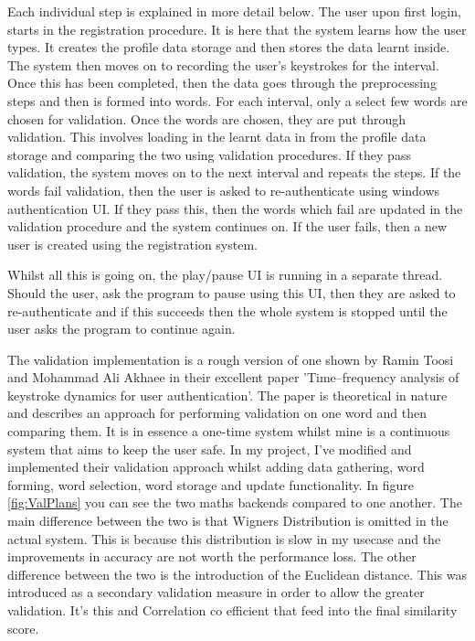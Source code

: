 \documentclass[10pt,a4paper]{report}
\begin{document}
Each individual step is explained in more detail below. The user upon first login, starts in the registration procedure. It is here that the system learns how the user types. It creates the profile data storage and then stores the data learnt inside. The system then moves on to recording the user's keystrokes for the interval. Once this has been completed, then the data goes through the preprocessing steps and then is formed into words. For each interval, only a select few words are chosen for validation. Once the words are chosen, they are put through validation. This involves loading in the learnt data in from the profile data storage and comparing the two using validation procedures. If they pass validation, the system moves on to the next interval and repeats the steps. If the words fail validation, then the user is asked to re-authenticate using windows authentication UI. If they pass this, then the words which fail are updated in the validation procedure and the system continues on. If the user fails, then a new user is created using the registration system. 

Whilst all this is going on, the play/pause UI is running in a separate thread. Should the user, ask the program to pause using this UI, then they are asked to re-authenticate and if this succeeds then the whole system is stopped until the user asks the program to continue again.

The validation implementation is a rough version of one shown by Ramin Toosi and Mohammad Ali Akhaee in their excellent paper 'Time–frequency analysis of keystroke dynamics for user authentication'. \cite{ToosiRamin2021Taok} The paper is theoretical in nature and describes an approach for performing validation on one word and then comparing them. It is in essence a one-time system whilst mine is a continuous system that aims to keep the user safe. In my project, I've modified and implemented their validation approach whilst adding data gathering, word forming, word selection, word storage and update functionality. In figure \ref{fig:ValPlans} you can see the two maths backends compared to one another. The main difference between the two is that Wigners Distribution is omitted in the actual system. This is because this distribution is slow in my usecase and the improvements in accuracy are not worth the performance loss. The other difference between the two is the introduction of the Euclidean distance. This was introduced as a secondary validation measure in order to allow the greater validation. It's this and Correlation co efficient that feed into the final similarity score.
\end{document}
